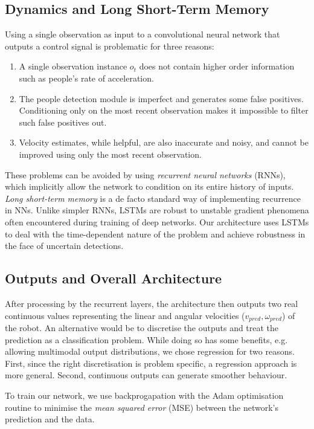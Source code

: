 \documentclass[letterpaper, 10 pt, conference]{ieeeconf}
\begin{document}
\subsection{Dynamics and Long Short-Term Memory}
Using a single observation as input to a convolutional neural network that outputs a control signal is problematic for three reasons:

\begin{enumerate}
\item A single observation instance $o_t$ does not contain higher order information such as people's rate of  acceleration.
\item The people detection module is imperfect and generates some false positives.  Conditioning only on the most recent observation makes it impossible to filter such false positives out.
\item Velocity estimates, while helpful, are also inaccurate and noisy, and cannot be improved using only the most recent observation.
\end{enumerate}

These problems can be avoided by using \emph{recurrent neural networks} (RNNs), which implicitly allow the network to condition on its entire history of inputs.  \emph{Long short-term memory} \cite{hochreiter1997long} is a de facto standard way of implementing recurrence in NNs. Unlike simpler RNNs, LSTMs are robust to unstable gradient phenomena often encountered during training of deep networks. Our architecture uses LSTMs to deal with the time-dependent nature of the problem and achieve robustness in the face of uncertain detections.

\subsection{Outputs and Overall Architecture}
After processing by the recurrent layers, the architecture then outputs two real continuous values representing the linear and angular velocities ($v_{pred},\omega_{pred}$) of the robot. An alternative would be to discretise the outputs and treat the prediction as a classification problem. While doing so has some benefits, e.g. allowing multimodal output distributions, we chose regression for two reasons. First, since the right discretisation is problem specific, a regression approach is more general. Second, continuous outputs can generate smoother behaviour. 

To train our network, we use backprogapation with the Adam \cite{kingma2014adam} optimisation routine to minimise the \emph{mean squared error} (MSE) between the network's prediction and the data. 
\end{document}
